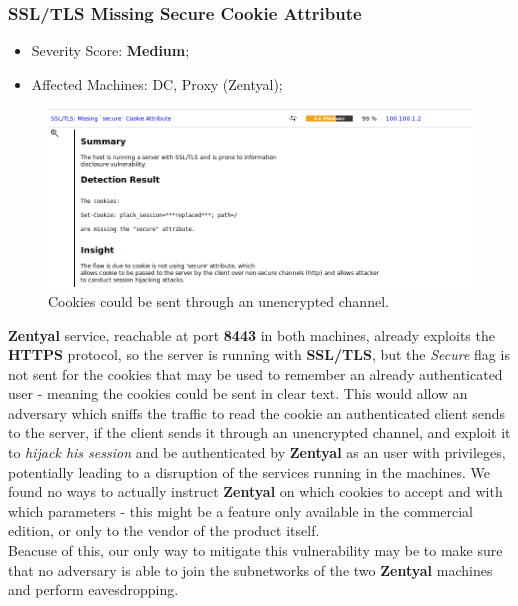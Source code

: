 \subsubsection{SSL/TLS Missing Secure Cookie Attribute}
\begin{itemize}
\item Severity Score: \textbf{Medium};
\item Affected Machines: DC, Proxy (Zentyal);
\end{itemize}
\begin{figure}[!htb]
\centering
\begin{minipage}{.5\textwidth}
  \centering
  \includegraphics[width=1\textwidth]{secureCookiesDCVuln.png}
  \caption[a]{Cookies could be sent through an unencrypted channel.}\label{fig:12}
\end{minipage}%
\end{figure}

\textbf{Zentyal} service, reachable at port \textbf{8443} in both machines, already exploits the \textbf{HTTPS} protocol, so the server is running with \textbf{SSL/TLS}, but the \textit{Secure} flag is not sent for the cookies that may be used to remember an already authenticated user - meaning the cookies could be sent in clear text. This would allow an adversary which sniffs the traffic to read the cookie an authenticated client sends to the server, if the client sends it through an unencrypted channel, and exploit it to \textit{hijack his session} and be authenticated by \textbf{Zentyal} as an user with privileges, potentially leading to a disruption of the services running in the machines. We found no ways to actually instruct \textbf{Zentyal} on which cookies to accept and with which parameters - this might be a feature only available in the commercial edition, or only to the vendor of the product itself.\\
Beacuse of this, our only way to mitigate this vulnerability may be to make sure that no adversary is able to join the subnetworks of the two \textbf{Zentyal} machines and perform eavesdropping.

